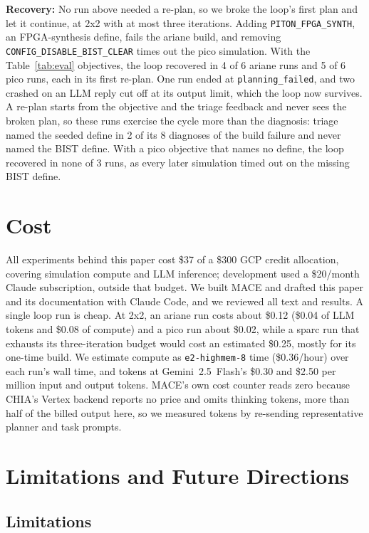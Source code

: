 \documentclass[10pt,conference,compsoc]{IEEEtran}
\newcommand{\code}[1]{\texttt{\small #1}}
\newcommand{\sys}{MACE}
\begin{document}
\textbf{Recovery:} No run above needed a re-plan, so we broke the loop's first plan and let it
continue, at 2x2 with at most three iterations. Adding \code{PITON\_FPGA\_SYNTH}, an FPGA-synthesis
define, fails the ariane build, and removing \code{CONFIG\_DISABLE\_BIST\_CLEAR} times out the pico
simulation. With the Table~\ref{tab:eval} objectives, the loop recovered in 4 of 6 ariane runs and 5
of 6 pico runs, each in its first re-plan. One run ended at \code{planning\_failed}, and two crashed on
an LLM reply cut off at its output limit, which the loop now survives. A re-plan starts from the
objective and the triage feedback and never sees the broken plan, so these runs exercise the cycle
more than the diagnosis: triage named the seeded define in 2 of its 8 diagnoses of the build failure
and never named the BIST define. With a pico objective that names no define, the loop recovered in none of 3 runs, as
every later simulation timed out on the missing BIST define.

\section{Cost}
\label{sec:cost}

All experiments behind this paper cost \$37 of a \$300 GCP credit allocation, covering simulation
compute and LLM inference; development used a \$20/month Claude subscription, outside that budget. We built \sys{} and drafted
this paper and its documentation with Claude Code, and we reviewed all text and results.
A single loop run is cheap. At 2x2, an ariane run costs about \$0.12 (\$0.04 of LLM tokens and
\$0.08 of compute) and a pico run about \$0.02, while a sparc run that exhausts its three-iteration
budget would cost an estimated \$0.25, mostly for its one-time build. We estimate compute as
\code{e2-highmem-8} time (\$0.36/hour) over each run's wall time, and tokens at Gemini~2.5~Flash's
\$0.30 and \$2.50 per million input and output tokens. \sys{}'s own cost counter reads zero because
CHIA's Vertex backend reports no price and omits thinking tokens, more than half of the billed output
here, so we measured tokens by re-sending representative planner and task prompts.

\section{Limitations and Future Directions}

\subsection{Limitations}
\label{sec:limits}
\end{document}
